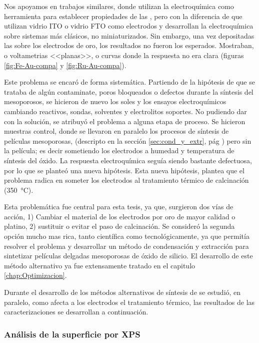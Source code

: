 {  		Nos apoyamos en trabajos similares\cite{Otal2006,Calvo2009b,Fattakhova-Rohlfing2007,Rohlfing2005}, donde utilizan la electroquímica como herramienta para establecer propiedades de las \pdm, pero con la diferencia de que utilizan vidrio ITO o vidrio FTO como electrodos y desarrollan la electroquímica sobre sistemas más clásicos, no miniaturizados. Sin embargo, una vez depositadas las \pdm\space sobre los electrodos de oro, los resultados no fueron los esperados.  Mostraban, o voltametrias <<planas>>, o curvas donde la respuesta no era clara (figuras \ref{fig:Fe-Au-compa} y \ref{fig:Ru-Au-compa}). 

  		Este problema se encaró de forma sistemática. Partiendo de la hipótesis de que se trataba de algún contaminate, poros bloqueados o defectos durante la síntesis del mesoporosos, se hicieron de nuevo los soles y los ensayos electroquímicos cambiando reactivos, sondas, solventes y electrolitos soportes. No pudiendo dar con la solución, se atribuyó el problema a alguna etapa de proceso. Se hicieron muestras control, donde se llevaron en paralelo los procesos de síntesis de películas mesoporosas, (descripto en la sección \ref{sec:cond_y_extr}, pág \pageref{sec:cond_y_extr}) pero sin la película; es decir sometiendo los electrodos a humedad y temperatura de síntesis del óxido. La respuesta electroquímica seguía siendo bastante defectuosa, por lo que se planteó una nueva hipótesis. Esta nueva hipótesis, plantea que el problema radica en someter los electrodos al tratamiento térmico de calcinación (\SI{350}{\celsius}).

  		Esta problemática fue central para esta tesis, ya que, surgieron dos vías de acción, 1) Cambiar el material de los electrodos por oro de mayor calidad o platino, 2) sustituir o evitar el paso de calcinación. Se consideró la segunda opción mucho mas rica, tanto científica como tecnológicamente, ya que permitía resolver el problema y desarrollar un método de condensación y extracción para sintetizar películas delgadas mesoporosas de óxido de silicio. El desarrollo de este método alternativo ya fue extensamente tratado en el capitulo \ref{chap:Optimizacion}.

  		Durante el desarrollo de los métodos alternativos de síntesis de \pdm\space se estudió, en paralelo, como afecta a los electrodos el tratamiento térmico, las resultados de las caracterizaciones se desarrollan a continuación.
			
		\subsubsection{Análisis de la superficie por XPS}

}
